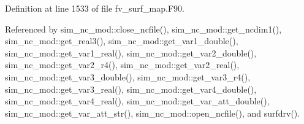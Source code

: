 Definition at line 1533 of file fv\-\_\-surf\-\_\-map.\-F90.



Referenced by sim\-\_\-nc\-\_\-mod\-::close\-\_\-ncfile(), sim\-\_\-nc\-\_\-mod\-::get\-\_\-ncdim1(), sim\-\_\-nc\-\_\-mod\-::get\-\_\-real3(), sim\-\_\-nc\-\_\-mod\-::get\-\_\-var1\-\_\-double(), sim\-\_\-nc\-\_\-mod\-::get\-\_\-var1\-\_\-real(), sim\-\_\-nc\-\_\-mod\-::get\-\_\-var2\-\_\-double(), sim\-\_\-nc\-\_\-mod\-::get\-\_\-var2\-\_\-r4(), sim\-\_\-nc\-\_\-mod\-::get\-\_\-var2\-\_\-real(), sim\-\_\-nc\-\_\-mod\-::get\-\_\-var3\-\_\-double(), sim\-\_\-nc\-\_\-mod\-::get\-\_\-var3\-\_\-r4(), sim\-\_\-nc\-\_\-mod\-::get\-\_\-var3\-\_\-real(), sim\-\_\-nc\-\_\-mod\-::get\-\_\-var4\-\_\-double(), sim\-\_\-nc\-\_\-mod\-::get\-\_\-var4\-\_\-real(), sim\-\_\-nc\-\_\-mod\-::get\-\_\-var\-\_\-att\-\_\-double(), sim\-\_\-nc\-\_\-mod\-::get\-\_\-var\-\_\-att\-\_\-str(), sim\-\_\-nc\-\_\-mod\-::open\-\_\-ncfile(), and surfdrv().


